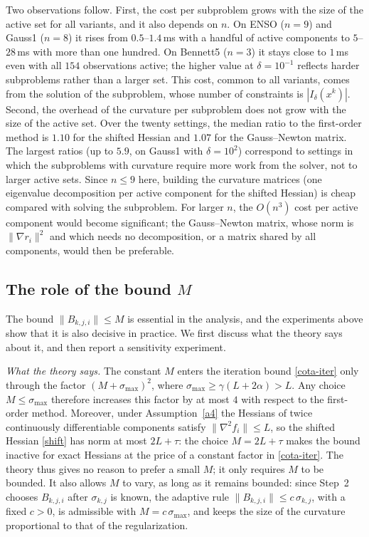 \documentclass[11pt]{article}
\begin{document}
Two observations follow. First, the cost per subproblem grows with the size of
the active set for all variants, and it also depends on $n$. On ENSO ($n=9$) and
Gauss1 ($n=8$) it rises from $0.5$--$1.4$\,ms with a handful of active
components to $5$--$28$\,ms with more than one hundred. On Bennett5 ($n=3$) it
stays close to $1$\,ms even with all $154$ observations active; the higher
value at $\delta = 10^{-1}$ reflects harder subproblems rather than a larger
set. This cost, common to all variants, comes from the solution of the
subproblem, whose number of constraints is $|I_\delta(x^k)|$. Second, the
overhead of the curvature per subproblem does not grow with the size of the
active set. Over the twenty settings, the median ratio to the first-order
method is $1.10$ for the shifted Hessian and $1.07$ for the Gauss--Newton
matrix. The largest ratios (up to $5.9$, on Gauss1 with $\delta = 10^2$)
correspond to settings in which the subproblems with curvature require more
work from the solver, not to larger active sets. Since $n \leq 9$ here,
building the curvature matrices (one eigenvalue decomposition per active
component for the shifted Hessian) is cheap compared with solving the
subproblem. For larger $n$, the $O(n^3)$ cost per active component would
become significant; the Gauss--Newton matrix, whose norm is
$\|\nabla r_i\|^2$ and which needs no decomposition, or a matrix shared by all
components, would then be preferable.

\subsection{The role of the bound $M$} \label{subsec:M}

The bound $\|B_{k,j,i}\|\le M$ is essential in the analysis, and the
experiments above show that it is also decisive in practice. We first discuss
what the theory says about it, and then report a sensitivity experiment.

\emph{What the theory says.} The constant $M$ enters the iteration bound
\eqref{cota-iter} only through the factor $(M + \sigma_{\max})^2$, where
$\sigma_{\max} \geq \gamma(L + 2\alpha) > L$. Any choice $M \leq \sigma_{\max}$
therefore increases this factor by at most $4$ with respect to the first-order
method. Moreover, under Assumption~\ref{a4} the Hessians of twice
continuously differentiable components satisfy $\|\nabla^2 f_i\| \leq L$, so
the shifted Hessian \eqref{shift} has norm at most $2L + \tau$: the choice
$M = 2L + \tau$ makes the bound inactive for exact Hessians at the price of a
constant factor in \eqref{cota-iter}. The theory thus gives no reason to
prefer a small $M$; it only requires $M$ to be bounded. It also allows $M$ to
vary, as long as it remains bounded: since Step~2 chooses $B_{k,j,i}$ after
$\sigma_{k,j}$ is known, the adaptive rule $\|B_{k,j,i}\| \leq c\,\sigma_{k,j}$,
with a fixed $c > 0$, is admissible with $M = c\,\sigma_{\max}$, and keeps the
size of the curvature proportional to that of the regularization.
\end{document}
